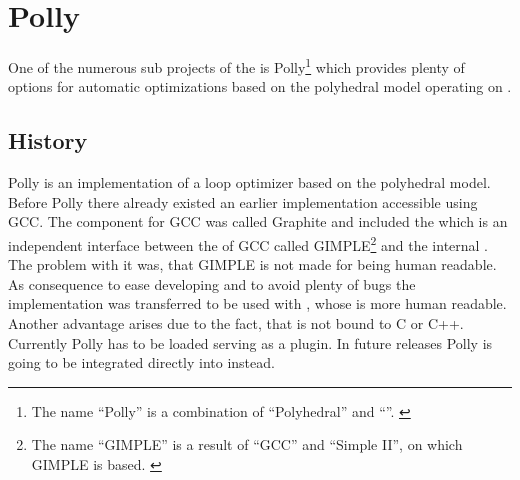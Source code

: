\chapter{Polly}
One of the numerous sub projects of the \llvm is Polly\footnote{The name \enquote{Polly} is a combination of \enquote{Polyhedral} and \enquote{\llvm}. \cite{PollyGrosser}} which provides plenty of options for automatic optimizations based on the polyhedral model operating on \llvmir.

\section{History}
Polly is an implementation of a loop optimizer based on the polyhedral model.\\
Before Polly there already existed an earlier implementation accessible using GCC.
The component for GCC was called Graphite \cite{gccGraphite} and included the \pcp \cite{GrosserGraphite, GrosserGraphiteDesign} which is an independent interface between the \ir of GCC called GIMPLE\footnote{The name \enquote{GIMPLE} is a result of \enquote{GCC} and \enquote{Simple II}, on which GIMPLE is based. \cite{GenericGimple}} and the internal \ir \gpoly.
The problem with it was, that GIMPLE is not made for being human readable.
As consequence to ease developing and to avoid plenty of bugs the implementation was transferred to be used with \llvm, whose \ir is more human readable.
Another advantage arises due to the fact, that \llvm is not bound to C or C++.
Currently Polly has to be loaded serving as a \llvm plugin.
In future releases Polly is going to be integrated directly into \llvm instead.

